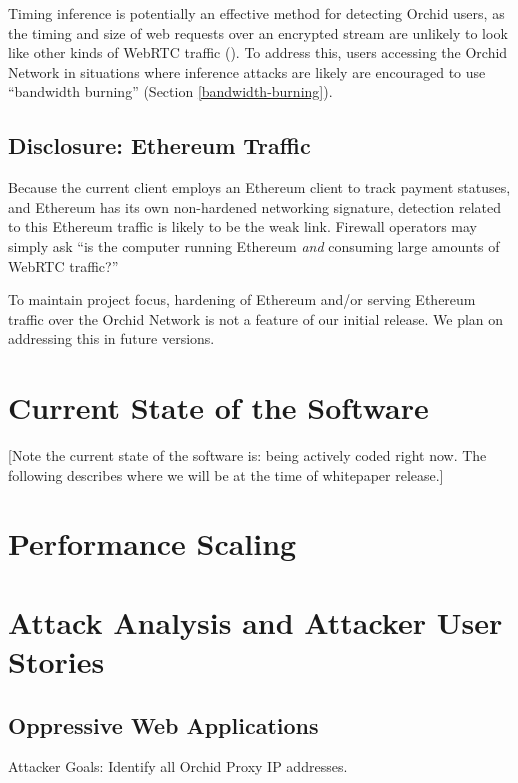 \documentclass{article}
\newcommand{\mesh}{Orchid}
\newcommand{\Mesh}{\mesh}
\begin{document}
Timing inference is potentially an effective method for detecting
Orchid users, as the timing and size of web requests over an encrypted
stream are unlikely to look like other kinds of WebRTC traffic
(\cite{peekaboo}). To address this, users accessing the Orchid Network
in situations where inference attacks are likely are encouraged to use
``bandwidth burning'' (Section \ref{bandwidth-burning}).

\subsection{Disclosure: Ethereum Traffic}

Because the current client employs an Ethereum client to track payment
statuses, and Ethereum has its own non-hardened networking signature,
detection related to this Ethereum traffic is likely to be the weak
link. Firewall operators may simply ask ``is the computer running
Ethereum \emph{and} consuming large amounts of WebRTC traffic?''

To maintain project focus, hardening of Ethereum and/or serving
Ethereum traffic over the Orchid Network is not a feature of our
initial release. We plan on addressing this in future versions.

\section{Current State of the Software}
\label{sec:current}

[Note the current state of the software is: being actively coded right
now. The following describes where we will be at the time of
whitepaper release.]

\section{Performance Scaling}
\label{sec:performance}


\section{Attack Analysis and Attacker User Stories}
\label{sec:attack-stories}

\subsection{Oppressive Web Applications}

Attacker Goals: Identify all \Mesh{} Proxy IP addresses.
\end{document}
